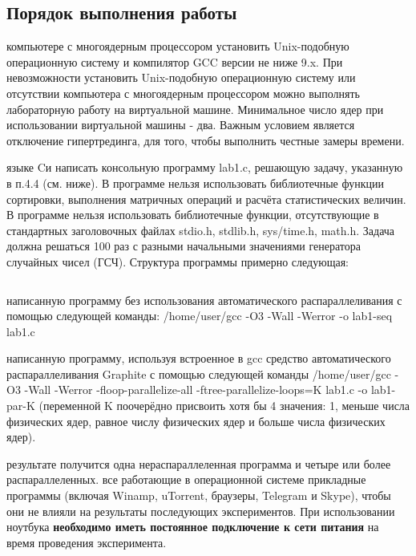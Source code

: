 \subsection{Порядок выполнения работы}
\begin{enumerate}
     компьютере с многоядерным процессором установить Unix-\linebreak подобную операционную систему и компилятор GCC версии не ниже 9.x. При невозможности установить Unix-подобную операционную систему или отсутствии компьютера с многоядерным процессором можно выполнять лабораторную работу на виртуальной машине. Минимальное число ядер при использовании виртуальной машины - два. Важным условием является отключение гипертрединга, для того, чтобы выполнить честные замеры времени. 
    
     языке Cи написать консольную программу lab1.c, решающую задачу, указанную в п.4.4 (см. ниже). В программе нельзя использовать библиотечные функции сортировки, выполнения матричных операций и расчёта статистических величин. В программе нельзя использовать библиотечные функции, отсутствующие в стандартных заголовочных файлах stdio.h, stdlib.h, sys/time.h, math.h. Задача должна решаться 100 раз с разными начальными значениями генератора случайных чисел (ГСЧ). Структура программы примерно следующая:

    \inputminted[fontsize=\footnotesize]{c++}{listings/lab1Example.cpp}

     написанную программу без использования автоматического распараллеливания с помощью следующей команды: /home/user/gcc -O3 -Wall -Werror -o lab1-seq lab1.c
    
     написанную программу, используя встроенное в gcc средство автоматического распараллеливания Graphite с помощью следующей команды  /home/user/gcc -O3 -Wall -Werror -floop-parallelize-all -ftree-parallelize-loops=K lab1.c -o lab1-par-K (переменной K поочерёдно присвоить хотя бы 4 значения: 1, меньше числа физических ядер, равное числу физических ядер и больше числа физических ядер).
    
     результате получится одна нераспараллеленная программа и четыре или более распараллеленных.
     все работающие в операционной системе прикладные программы (включая Winamp, uTorrent, браузеры, Telegram и Skype), чтобы они не влияли на результаты последующих экспериментов. При использовании ноутбука \textbf{необходимо иметь постоянное подключение к сети питания} на время проведения эксперимента.
    

\end{enumerate}
